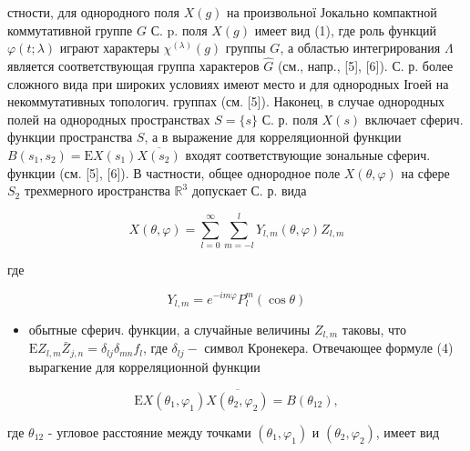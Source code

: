 \documentclass[10pt]{article}
\begin{document}
стности, для однородного поля $X(g)$ на произвольної Јокально компактной коммутативной группе $G$ С. p. поля $X(g)$ имеет вид (1), где роль функций $\varphi(t ; \lambda)$ играют характеры $\chi^{(\lambda)}(g)$ группы $G$, а областью интегрирования $\Lambda$ является соответствующая группа характеров $\widehat{G}$ (см., напр., [5], [6]). С. р. более сложного вида при широких условиях имеют место и для однородных Ігоей на некоммутативных топологич. группах (см. [5]). Наконец, в случае однородных полей на однородных пространствах $S=\{s\}$ С. р. поля $X(s)$ включает сферич. функции пространства $S$, а в выражение для корреляционной функции $B\left(s_{1}, s_{2}\right)=\mathrm{E} X\left(s_{1}\right) \overline{X\left(s_{2}\right)}$ входят соответствующие зональные сферич. функции (см. [5], [6]). В частности, общее однородное поле $X(\theta, \varphi)$ на сфере $S_{2}$ трехмерного иространства $\mathbb{R}^{3}$ допускает С. р. вида



\[

X(\theta, \varphi)=\sum_{l=0}^{\infty} \sum_{m=-l}^{l} Y_{l, m}(\theta, \varphi) Z_{l, m}

\]



где



\[

Y_{l, m}=e^{-i m \varphi} P_{l}^{m}(\cos \theta)

\]



\begin{itemize}

  \item обытные сферич. функции, а случайные величины $Z_{l, m}$ таковы, что $\mathrm{E} Z_{l, m} \bar{Z}_{j, n}=\delta_{l j} \delta_{m n} f_{l}$, где $\delta_{l j}-$ символ Кронекера. Отвечающее формуле (4) вырагкение для корреляционной функции

\end{itemize}



\[

\mathrm{E} X\left(\theta_{1}, \varphi_{1}\right) \overline{X\left(\theta_{2}, \varphi_{2}\right)}=B\left(\theta_{12}\right),

\]



где $\theta_{12}$ - угловое расстояние между точками $\left(\theta_{1}, \varphi_{1}\right)$ и $\left(\theta_{2}, \varphi_{2}\right)$, имеет вид
\end{document}
